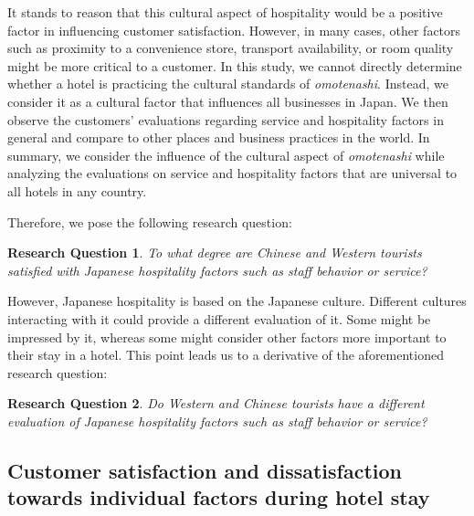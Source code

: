 \documentclass[smallextended,natbib]{svjour3}       %
\makeatletter
\newtheorem{rsq}{Research Question}
\newcounter{subrsq}
\newenvironment{subrsq}
         {%
          \setcounter{subrsq}{0}%
          \stepcounter{rsq}%
          \edef\saved@rsq{\thersq}%
          \let\c@rsq\c@subrsq     %
          \renewcommand{\thersq}{\saved@rsq\alph{rsq}}%
         }
         {}
\makeatother
\begin{document}
    It stands to reason that this cultural aspect of hospitality would be a positive factor in influencing customer satisfaction. However, in many cases, other factors such as proximity to a convenience store, transport availability, or room quality might be more critical to a customer.  In this study, we cannot directly determine whether a hotel is practicing the cultural standards of \textit{omotenashi}. Instead, we consider it as a cultural factor that influences all businesses in Japan. We then observe the customers' evaluations regarding service and hospitality factors in general and compare to other places and business practices in the world. In summary, we consider the influence of the cultural aspect of \textit{omotenashi} while analyzing the evaluations on service and hospitality factors that are universal to all hotels in any country.

    Therefore, we pose the following research question:

    \begin{subrsq}
    \begin{rsq}
    \label{rsq:hospitality}
    To what degree are Chinese and Western tourists satisfied with Japanese hospitality factors such as staff behavior or service?
    \end{rsq}

    However, Japanese hospitality is based on the Japanese culture. Different cultures interacting with it could provide a different evaluation of it. Some might be impressed by it, whereas some might consider other factors more important to their stay in a hotel. This point leads us to a derivative of the aforementioned research question:

    \begin{rsq}
    \label{rsq:hospitality_both}
    Do Western and Chinese tourists have a different evaluation of Japanese hospitality factors such as staff behavior or service?
    \end{rsq}
    \end{subrsq}

  \subsection{Customer satisfaction and dissatisfaction towards individual factors during hotel stay}\label{theory_satisfaction}
\end{document}

